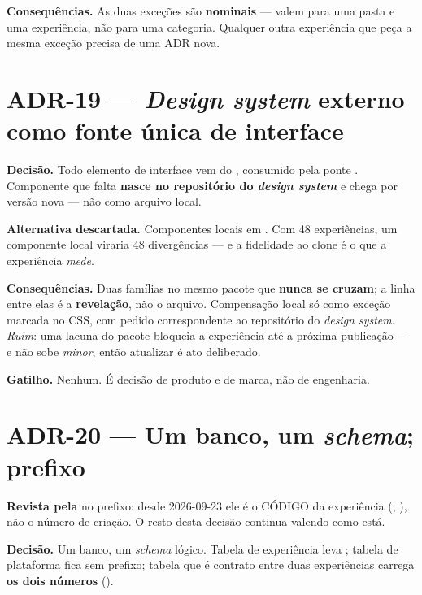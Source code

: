 \textbf{Consequências.} As duas exceções são \textbf{nominais} --- valem para uma
pasta e uma experiência, não para uma categoria. Qualquer outra experiência que
peça a mesma exceção precisa de uma ADR nova.

\section{ADR-19 --- \emph{Design system} externo como fonte única de interface}

\textbf{Decisão.} Todo elemento de interface vem do ,
consumido pela ponte . Componente que falta \textbf{nasce no
repositório do \emph{design system}} e chega por versão nova --- não como arquivo
local.

\textbf{Alternativa descartada.} Componentes locais em . Com 48
experiências, um componente local viraria 48 divergências --- e a fidelidade ao
clone é o que a experiência \emph{mede}.

\textbf{Consequências.} Duas famílias no mesmo pacote que \textbf{nunca se
cruzam}; a linha entre elas é a \textbf{revelação}, não o arquivo. Compensação
local só como exceção marcada no CSS, com pedido correspondente ao repositório do
\emph{design system}. \emph{Ruim}: uma lacuna do pacote bloqueia a experiência até
a próxima publicação --- e  não sobe \emph{minor}, então atualizar é
ato deliberado.

\textbf{Gatilho.} Nenhum. É decisão de produto e de marca, não de engenharia.

\section{ADR-20 --- Um banco, um \emph{schema}; prefixo }

\textbf{Revista pela } no prefixo: desde 2026-09-23 ele é o CÓDIGO
da experiência (, ), não o número de criação. O
resto desta decisão continua valendo como está.

\textbf{Decisão.} Um banco, um \emph{schema} lógico. Tabela de experiência leva
; tabela de plataforma fica sem prefixo; tabela que é contrato entre
duas experiências carrega \textbf{os dois números}
().

